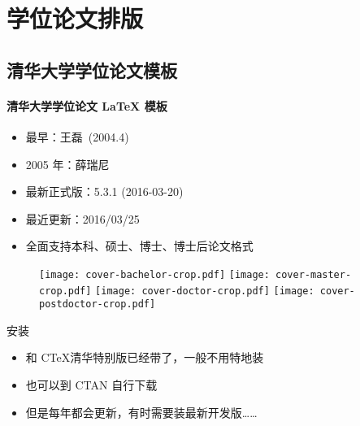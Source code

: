 \section{学位论文排版}
\subsection{\ThuThesis 清华大学学位论文模板}

\begin{frame}{\ThuThesis}
  \framesubtitle{清华大学学位论文 \LaTeX{} 模板}
  \begin{itemize}
  \item 最早：王磊~(2004.4)
  \item 2005 年：薛瑞尼
  \item 最新正式版：5.3.1 (2016-03-20)
  \item 最近更新：2016/03/25
  \item 全面支持本科、硕士、博士、博士后论文格式
  \end{itemize}
  \begin{figure}[htbp]
    \centering
    \texttt{[image: cover-bachelor-crop.pdf]}\hfill
    \texttt{[image: cover-master-crop.pdf]}\hfill
    \texttt{[image: cover-doctor-crop.pdf]}\hfill
    \texttt{[image: cover-postdoctor-crop.pdf]}
  \end{figure}
\end{frame}

\begin{frame}{安装\ThuThesis}

\begin{itemize}
	\item \TL 和 C\TeX 清华特别版已经带了，一般不用特地装
    \item 也可以到 CTAN 自行下载
	\item 但是每年都会更新，有时需要装最新开发版……
\end{itemize}
	

\end{frame}

